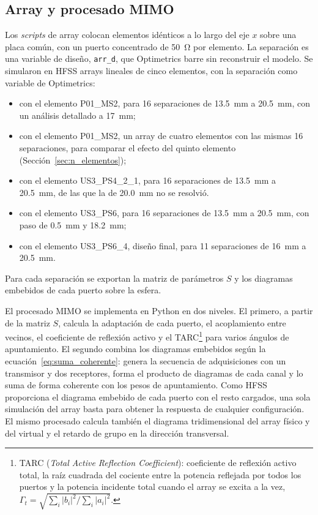 \documentclass[11pt,a4paper]{article}
\begin{document}
\subsection{Array y procesado MIMO}\label{sec:desarrollo_array}
Los \textit{scripts} de array colocan elementos idénticos a lo largo del eje $x$ sobre una placa
común, con un puerto concentrado de \SI{50}{\ohm} por elemento. La separación es una variable
de diseño, \texttt{arr\_d}, que Optimetrics barre sin reconstruir el modelo. Se simularon en
HFSS arrays lineales de cinco elementos, con la separación como variable de Optimetrics:
\begin{itemize}
    \item con el elemento P01\_MS2, para 16 separaciones de \SI{13.5}{mm} a \SI{20.5}{mm}, con un análisis
    detallado a \SI{17}{mm};
    \item con el elemento P01\_MS2, un array de cuatro elementos con las mismas 16 separaciones, para comparar el efecto del quinto elemento (Sección~\ref{sec:n_elementos});
    \item con el elemento US3\_PS4\_2\_1, para 16 separaciones de \SI{13.5}{mm} a \SI{20.5}{mm}, de las que la de \SI{20.0}{mm} no se resolvió.
    \item con el elemento US3\_PS6, para 16 separaciones de \SI{13.5}{mm} a \SI{20.5}{mm}, con paso de \SI{0.5}{mm} y \SI{18.2}{mm};
    \item con el elemento US3\_PS6\_4, diseño final, para 11 separaciones de \SI{16}{mm} a \SI{20.5}{mm}.
\end{itemize}
Para cada separación se exportan la matriz de parámetros $S$ y los diagramas embebidos de cada
puerto sobre la esfera.

El procesado MIMO se implementa en Python en dos niveles. El primero, a partir de la matriz $S$,
calcula la adaptación de cada puerto, el acoplamiento entre vecinos, el coeficiente de reflexión
activo y el TARC\footnote{TARC (\textit{Total Active Reflection Coefficient}): coeficiente de reflexión activo total, la raíz cuadrada del cociente entre la potencia reflejada por todos los puertos y la potencia incidente total cuando el array se excita a la vez, $\Gamma_t = \sqrt{\sum_i |b_i|^2 / \sum_i |a_i|^2}$.} para varios ángulos de apuntamiento. El segundo combina los diagramas embebidos
según la ecuación~\eqref{eq:suma_coherente}: genera la secuencia de adquisiciones con un
transmisor y dos receptores, forma el producto de diagramas de cada canal y lo suma de forma
coherente con los pesos de apuntamiento. Como HFSS proporciona el diagrama embebido de cada puerto
con el resto cargados, una sola simulación del array basta para obtener la respuesta de cualquier
configuración. El mismo procesado calcula también el diagrama tridimensional del array físico y
del virtual y el retardo de grupo en la dirección transversal.
\end{document}
